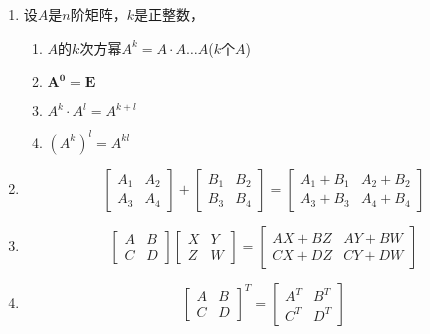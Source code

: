 \documentclass[a4paper,12pt]{article}
\begin{document}
\begin{enumerate}
        \item 设$A$是$n$阶矩阵，$k$是正整数，
        \begin{enumerate}
            \item $A$的$k$次方幂$A^k = A \cdot A \dots A$($k$个$A$)
            \item $\mathbf{A^0 = E}$
            \item $A^k \cdot A^l = A^{k+l}$
            \item $(A^k)^l = A^{kl}$
        \end{enumerate}
        \item
        \[
            \begin{bmatrix}
                A_1 & A_2 \\
                A_3 & A_4
            \end{bmatrix}
            + \begin{bmatrix}
                  B_1 & B_2 \\
                  B_3 & B_4
            \end{bmatrix}
            = \begin{bmatrix}
                  A_1 + B_1 & A_2 + B_2 \\
                  A_3 + B_3 & A_4 + B_4
            \end{bmatrix}
        \]
        \item
        \[
            \begin{bmatrix}
                A & B \\
                C & D
            \end{bmatrix}
            \begin{bmatrix}
                X & Y \\
                Z & W
            \end{bmatrix}
            = \begin{bmatrix}
                  AX + BZ & AY + BW \\
                  CX + DZ & CY + DW
            \end{bmatrix}
        \]
        \item
        \[
            \begin{bmatrix}
                A & B \\
                C & D
            \end{bmatrix}^{T}
            = \begin{bmatrix}
                  A^T & B^T \\
                  C^T & D^T
            \end{bmatrix}
\]
\end{enumerate}
\end{document}
